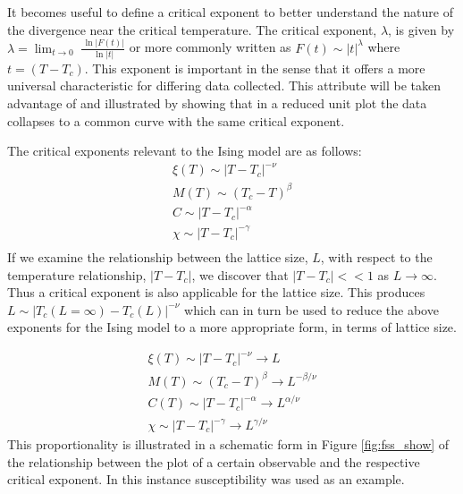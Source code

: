 \documentclass[a4paper]{article}
\begin{document}
It becomes useful to define a critical exponent to better understand
the nature of the divergence near the critical temperature. The
critical exponent, $\lambda$, is given by $\lambda
=\lim_{t\rightarrow0}\ \frac{\ \ln|F(t)|}{\ \ln|t|}$ or more commonly written
as $F(t)\sim |t|^\lambda$ where $t=(T-T_c)$. This exponent is important
in the sense that it offers a more universal characteristic for
differing data collected. This attribute will be taken advantage of
 and illustrated by showing that in a reduced unit plot the data
 collapses to a common curve with the same critical exponent. 

The critical exponents relevant to the Ising model are as follows:
\begin{eqnarray*}
  \xi(T) \sim|T-T_c|^{-\nu} \\
  M(T) \sim(T_c-T)^\beta   \\
  C \sim|T-T_c|^{-\alpha} \\
  \chi \sim|T-T_c|^{-\gamma} \\
\end{eqnarray*}
If we examine the relationship between the lattice size, $L$, with respect
to the temperature relationship, $|T-T_c|$, we discover that
$|T-T_c|<<1$ as $L\rightarrow \infty$. Thus a critical exponent is
also applicable for the lattice size. This produces $L \sim
|T_c(L=\infty ) - T_c(L)|^{-\nu}$ which can in turn be used to reduce
the above exponents for the Ising model to a more appropriate form, in
terms of lattice size.

\begin{eqnarray}
  \xi(T) \sim|T-T_c|^{-\nu} \rightarrow L \label{eq:z-L} \\
  M(T) \sim(T_c-T)^\beta \rightarrow L^{-\beta/\nu} \label{eq:m-L} \\
  C(T) \sim|T-T_c|^{-\alpha}\rightarrow L^{\alpha /\nu} \label{eq:C-L} \\
  \chi \sim|T-T_c|^{-\gamma} \rightarrow L^{\gamma /\nu} \label{eq:X-L} 
\end{eqnarray}
This proportionality is illustrated in a schematic form in 
Figure \ref{fig:fss_show} of the relationship between the plot of a
certain observable and the respective critical exponent. In this
instance susceptibility was used as an example. 
\end{document}
